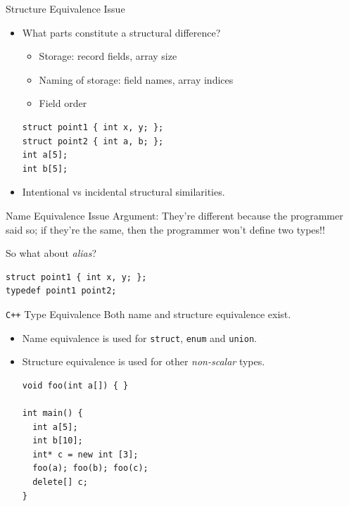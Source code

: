 \documentclass[presentation]{beamer}
\begin{document}
\begin{frame}[fragile,label={sec:orgheadline63}]{Structure Equivalence Issue}
 \begin{itemize}
\item What parts constitute a structural difference?
\begin{itemize}
\item Storage: record fields, array size
\item Naming of storage: field names, array indices
\item Field order
\end{itemize}
\begin{verbatim}
struct point1 { int x, y; };
struct point2 { int a, b; };
int a[5];
int b[5];
\end{verbatim}

\item Intentional vs incidental structural similarities.
\end{itemize}
\end{frame}

\begin{frame}[fragile,label={sec:orgheadline64}]{Name Equivalence Issue}
 Argument: They're different because the programmer said so; if
they're the same, then the programmer won't define two types!!

So what about \emph{alias}?

\begin{verbatim}
struct point1 { int x, y; };
typedef point1 point2;
\end{verbatim}
\end{frame}

\begin{frame}[fragile,label={sec:orgheadline65}]{\texttt{C++} Type Equivalence}
 Both name and structure equivalence exist.

\begin{itemize}
\item Name equivalence is used for \texttt{struct}, \texttt{enum} and \texttt{union}.
\item Structure equivalence is used for other \emph{non-scalar} types.

\begin{verbatim}
void foo(int a[]) { }

int main() {
  int a[5];
  int b[10];
  int* c = new int [3];
  foo(a); foo(b); foo(c);
  delete[] c;
}
\end{verbatim}
\end{itemize}
\end{frame}
\end{document}
